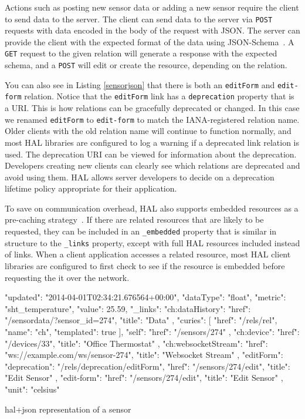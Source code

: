 \documentclass{acm_proc_article-sp}
\begin{document}
Actions such as posting new sensor data or adding a new sensor require the
client to send data to the server. The client can send data to the server via
\texttt{POST} requests with data encoded in the body of the request with JSON.
The server can provide the client with the expected format of the data using
JSON-Schema~\cite{json-schema-draft}. A \texttt{GET} request to the given
relation will generate a response with the expected schema, and a \texttt{POST}
will edit or create the resource, depending on the relation.

You can also see in Listing \ref{sensorjson} that there is both an
\mbox{\texttt{editForm}} and \texttt{edit-form} relation. Notice that the
\texttt{editForm} link has a \texttt{deprecation} property that is a URI.  This
is how relations can be gracefully deprecated or changed. In this case we
renamed \texttt{editForm} to \texttt{edit-form} to match the IANA-registered
relation name. Older clients with the old relation name will continue to
function normally, and most HAL libraries are configured to log a warning if a
deprecated link relation is used. The deprecation URI can be viewed for
information about the deprecation. Developers creating new clients can clearly
see which relations are deprecated and avoid using them. HAL allows server
developers to decide on a deprecation lifetime policy appropriate for their
application.

To save on communication overhead, HAL also supports embedded resources as a
pre-caching strategy~\cite{json-hal-draft}. If there are related resources that
are likely to be requested, they can be included in an \texttt{\_embedded}
property that is similar in structure to the \texttt{\_links} property, except
with full HAL resources included instead of links. When a client application
accesses a related resource, most HAL client libraries are configured to first
check to see if the resource is embedded before requesting the it over the
network.

\begin{listing}
\begin{jsoncode}
  {
    "updated": "2014-04-01T02:34:21.676564+00:00",
    "dataType": "float",
    "metric": "sht_temperature",
    "value": 25.59,
    "_links": {
      "ch:dataHistory": {
        "href": "/sensordata/?sensor_id=274",
        "title": "Data"
      },
      "curies": [
        {
          "href": "/rels/{rel}",
          "name": "ch",
          "templated": true
        }
      ],
      "self": {
        "href": "/sensors/274"
      },
      "ch:device": {
        "href": "/devices/33",
        "title": "Office Thermostat"
      },
      "ch:websocketStream": {
        "href": "ws://example.com/ws/sensor-274",
        "title": "Websocket Stream"
      },
      "editForm": {
        "deprecation": "/rels/deprecation/editForm",
        "href": "/sensors/274/edit",
        "title": "Edit Sensor"
      },
      "edit-form": {
        "href": "/sensors/274/edit",
        "title": "Edit Sensor"
      }
    },
    "unit": "celsius"
  }
\end{jsoncode}
\caption{hal+json representation of a sensor}
\label{sensorjson}
\end{listing}
\end{document}
